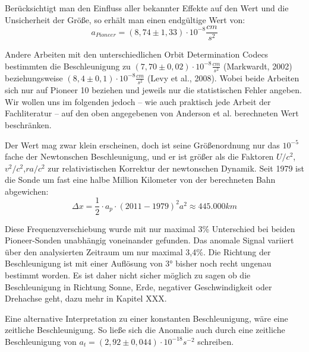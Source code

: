 Berücksichtigt man den Einfluss aller bekannter Effekte auf den Wert und die Unsicherheit der Größe\cite{Turyshev2004}, so erhält man einen endgültige Wert von:  
\begin{equation}
  a_{Pioneer} = (8,74\pm1,33)\cdot10^{-8}\frac{cm}{s^2}
\end{equation}

Andere Arbeiten mit den  unterschiedlichen Orbit Determination Codecs bestimmten die Beschleunigung zu $(7,70
\pm0,02)\cdot10^{-8}\frac{cm}{s^2}$ (Markwardt, 2002)\cite{Markwardt2002} beziehungsweise %
$(8,4\pm0,1)\cdot10^{-8}\frac{cm}{s^2}$ (Levy et al., 2008)\cite{Levy2008}.
Wobei beide Arbeiten sich nur auf Pioneer 10 beziehen und jeweils nur die statistischen Fehler angeben.
Wir wollen uns im folgenden jedoch – wie auch praktisch jede Arbeit der Fachliteratur – auf den oben angegebenen von
Anderson et al. berechneten Wert beschränken.

Der Wert mag zwar klein erscheinen, doch ist seine Größenordnung nur das $10^{-5}$ fache der Newtonschen Beschleunigung,
und er ist größer als die Faktoren $U/c^2$,$v^2/c^2$,$r a/c^2$ zur relativistischen Korrektur der newtonschen Dynamik.
Seit 1979 ist die Sonde um fast eine halbe Million Kilometer von der berechneten Bahn abgewichen:
\begin{equation}
  \Delta x= \frac12 \cdot a_p \cdot (2011-1979)^2 a^2\approx 445.000 km
\end{equation}

Diese Frequenzverschiebung wurde mit nur maximal 3\% Unterschied bei beiden Pioneer-Sonden unabhängig voneinander
gefunden. Das anomale Signal variiert über den analysierten Zeitraum um nur maximal 3,4\%\cite{Turyshev2004}. Die Richtung der
Beschleunigung ist mit einer Auflösung von 3° bisher noch recht ungenau bestimmt worden. Es ist daher nicht sicher möglich
zu sagen ob die Beschleunigung
in Richtung Sonne, Erde, negativer Geschwindigkeit oder Drehachse geht, dazu mehr in Kapitel XXX.

Eine alternative Interpretation zu einer konstanten Beschleunigung, wäre eine zeitliche Beschleunigung.
So ließe sich die Anomalie auch durch eine zeitliche Beschleunigung von $a_t = (2,92 \pm 0,044) \cdot 10^{-18} s^{-2}$ schreiben.

